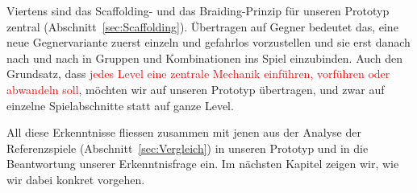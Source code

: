 \documentclass[../Main.tex]{subfiles}
\begin{document}
Viertens sind das Scaffolding- und das Braiding-Prinzip für unseren Prototyp zentral (Abschnitt~\ref{sec:Scaffolding}). Übertragen auf Gegner bedeutet das, eine neue Gegnervariante zuerst einzeln und gefahrlos vorzustellen und sie erst danach nach und nach in Gruppen und Kombinationen ins Spiel einzubinden. Auch den Grundsatz, dass \textcolor{red}{jedes Level eine zentrale Mechanik einführen, vorführen oder abwandeln soll}, möchten wir auf unseren Prototyp übertragen, und zwar auf einzelne Spielabschnitte statt auf ganze Level.

All diese Erkenntnisse fliessen zusammen mit jenen aus der Analyse der Referenzspiele (Abschnitt~\ref{sec:Vergleich}) in unseren Prototyp und in die Beantwortung unserer Erkenntnisfrage ein. Im nächsten Kapitel zeigen wir, wie wir dabei konkret vorgehen.
\end{document}
